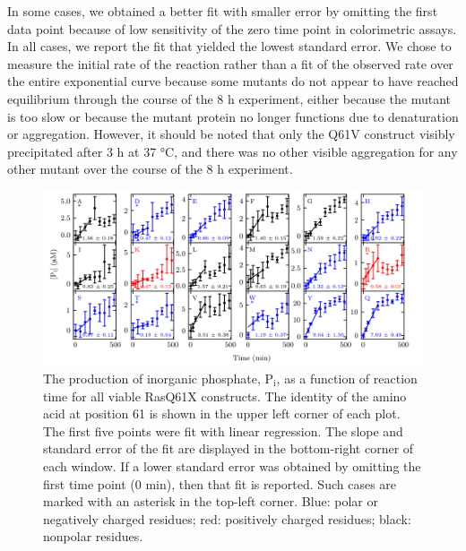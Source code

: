 In some cases, we obtained a better fit with smaller error by omitting the first data point because of low sensitivity of the zero time point in colorimetric assays. 
In all cases, we report the fit that yielded the lowest standard error. 
We chose to measure the initial rate of the reaction rather than a fit of the observed rate over the entire exponential curve because some mutants do not appear to have reached equilibrium through the course of the 8 h experiment, either because the mutant is too slow or because the mutant protein no longer functions due to denaturation or aggregation. 
However, it should be noted that only the Q61V construct visibly precipitated after 3 h at 37 \si{\celsius}, and there was no other visible aggregation for any other mutant over the course of the 8 h experiment.

\begin{figure} 
    \center
    \includegraphics[width=\double]{figures-ras/all_fits.png}
    \caption[Phosphate production in each RasQ61X mutant]{
        The production of inorganic phosphate, P$_\text{i}$, as a function of reaction time for all viable RasQ61X constructs. 
        The identity of the amino acid at position 61 is shown in the upper left corner of each plot. 
        The first five points were fit with linear regression. 
        The slope and standard error of the fit are displayed in the bottom-right corner of each window. 
        If a lower standard error was obtained by omitting the first time point (0 min), then that fit is reported. 
        Such cases are marked with an asterisk in the top-left corner. 
        Blue: polar or negatively charged residues; red: positively charged residues; black: nonpolar residues.
    }
    \label{fig:ras-all_fits}
\end{figure}

